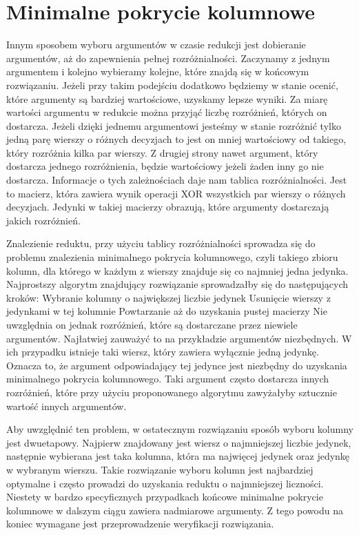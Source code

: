 \section{Minimalne pokrycie kolumnowe}

Innym sposobem wyboru argumentów w czasie redukcji jest dobieranie argumentów, aż do zapewnienia pełnej rozróżnialności.
Zaczynamy z jednym argumentem i kolejno wybieramy kolejne, które znajdą się w końcowym rozwiązaniu.
Jeżeli przy takim podejściu dodatkowo będziemy w stanie ocenić, które argumenty są bardziej wartościowe, uzyskamy lepsze wyniki.
Za miarę wartości argumentu w redukcie można przyjąć liczbę rozróżnień, których on dostarcza.
Jeżeli dzięki jednemu argumentowi jesteśmy w stanie rozróżnić tylko jedną parę wierszy o różnych decyzjach to jest on mniej wartościowy od takiego, który rozróżnia kilka par wierszy.
Z drugiej strony nawet argument, który dostarcza jednego rozróżnienia, będzie wartościowy jeżeli żaden inny go nie dostarcza.
Informacje o tych zależnościach daje nam tablica rozróżnialności.
Jest to macierz, która zawiera wynik operacji XOR wszystkich par wierszy o różnych decyzjach.
Jedynki w takiej macierzy obrazują, które argumenty dostarczają jakich rozróżnień.

Znalezienie reduktu, przy użyciu tablicy rozróżnialności sprowadza się do problemu znalezienia minimalnego pokrycia kolumnowego, czyli takiego zbioru kolumn, dla którego w każdym z wierszy znajduje się co najmniej jedna jedynka.
Najprostszy algorytm znajdujący rozwiązanie sprowadzałby się do następujących kroków:
Wybranie kolumny o największej liczbie jedynek
Usunięcie wierszy z jedynkami w tej kolumnie
Powtarzanie aż do uzyskania pustej macierzy
Nie uwzględnia on jednak rozróżnień, które są dostarczane przez niewiele argumentów.
Najłatwiej zauważyć to na przykładzie argumentów niezbędnych.
W ich przypadku istnieje taki wiersz, który zawiera wyłącznie jedną jedynkę.
Oznacza to, że argument odpowiadający tej jedynce jest niezbędny do uzyskania minimalnego pokrycia kolumnowego.
Taki argument często dostarcza innych rozróżnień, które przy użyciu proponowanego algorytmu zawyżałyby sztucznie wartość innych argumentów.

Aby uwzględnić ten problem, w ostatecznym rozwiązaniu sposób wyboru kolumny jest dwuetapowy.
Najpierw znajdowany jest wiersz o najmniejszej liczbie jedynek, następnie wybierana jest taka kolumna, która ma najwięcej jedynek oraz jedynkę w wybranym wierszu.
Takie rozwiązanie wyboru kolumn jest najbardziej optymalne i często prowadzi do uzyskania reduktu o najmniejszej liczności.
Niestety w bardzo specyficznych przypadkach końcowe minimalne pokrycie kolumnowe w dalszym ciągu zawiera nadmiarowe argumenty.
Z tego powodu na koniec wymagane jest przeprowadzenie weryfikacji rozwiązania.

